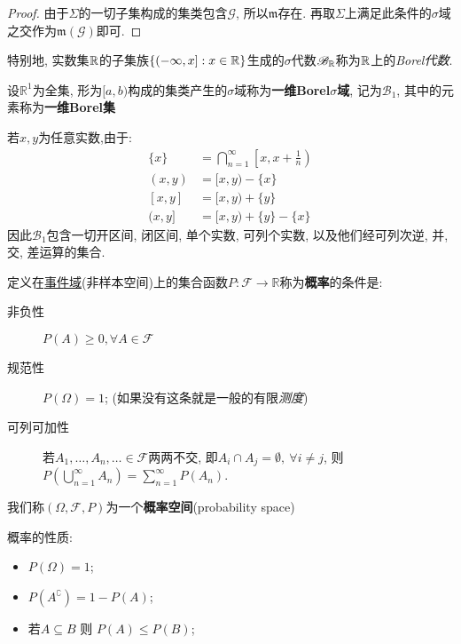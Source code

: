 \begin{proof}
    由于$\Sigma$的一切子集构成的集类包含$\mathscr{G}$, 所以$\mathfrak{m}$存在. 再取$\Sigma$上满足此条件的$\sigma$域之交作为$\mathfrak{m}(\mathscr{G})$即可.
\end{proof}

特别地, 实数集$\mathbb{R}$的子集族$\{(-\infty,x] : x\in\mathbb{R}\}$生成的$\sigma$代数$\mathscr{B}_{\mathbb{R}}$称为$\mathbb{R}$上的\emph{Borel代数}.

\begin{definition}[Borel集]
    设$\mathbb{R}^1$为全集, 形为$[a,b)$构成的集类产生的$\sigma$域称为\textbf{一维Borel$\sigma$域}, 记为$\mathscr{B}_1$, 其中的元素称为\textbf{一维Borel集}
\end{definition}

若$x,y$为任意实数,由于:
\begin{align*}
    \{x\}  & =  \bigcap_{n=1}^{\infty}\left[x, x+\frac{1}{n}\right) \\
    (x, y) & =  [x, y)-\{x\}                                        \\
    [x, y] & =  [x, y)+\{y\}                                        \\
    (x, y] & =  [x, y)+\{y\}-\{x\}
\end{align*}
因此$\mathscr{B}_1$包含一切开区间, 闭区间, 单个实数, 可列个实数, 以及他们经可列次逆, 并, 交, 差运算的集合.

\begin{definition}[概率空间]
    定义在\underline{事件域}(非样本空间)上的集合函数$P : \mathscr{F} \to \mathbb{R}$称为\textbf{概率}的条件是:
    \begin{description}
        \item[非负性] $P(A)\ge 0 , \forall A \in \mathscr{F}$
        \item[规范性] $P(\Omega) = 1$; (如果没有这条就是一般的{\color{lightgray}有限}\emph{测度})
        \item[可列可加性] 若$A_{1},\dots,A_{n},\ldots \in \mathscr{F}$两两不交, 即$A_{i}\cap A_{j} = \emptyset, \ \forall i\neq j$, 则$P(\bigcup_{n=1}^{\infty}A_{n}) = \sum_{n=1}^{\infty}P(A_{n})$.
    \end{description}
    我们称$(\Omega,\mathscr{F},P)$为一个\textbf{概率空间}(probability space)
\end{definition}

\begin{property}
    概率的性质:
    \begin{itemize}
        \item $P(\Omega)=1$;
        \item $P(A^{\complement})=1-P(A)$;
        \item 若$A \subseteq B $ 则 $P(A)\le P(B)$;
    \end{itemize}
\end{property}

